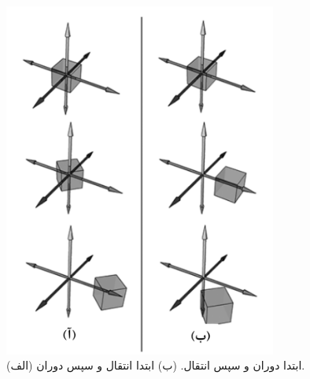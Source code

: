 {\begin{spacing}{1.5}
        \begin{figure}[H]
            \centering
            \setlength{\belowcaptionskip}{-10pt}
            \includegraphics[width=0.8\textwidth]{Images/4/3/4.Session.1.3.9}
            \caption {(الف) ابتدا دوران و سپس انتقال. (ب) ابتدا انتقال و سپس دوران.}
            \label{fig:4.Session.1.3.9}
        \end{figure}
    \end{spacing}
}


